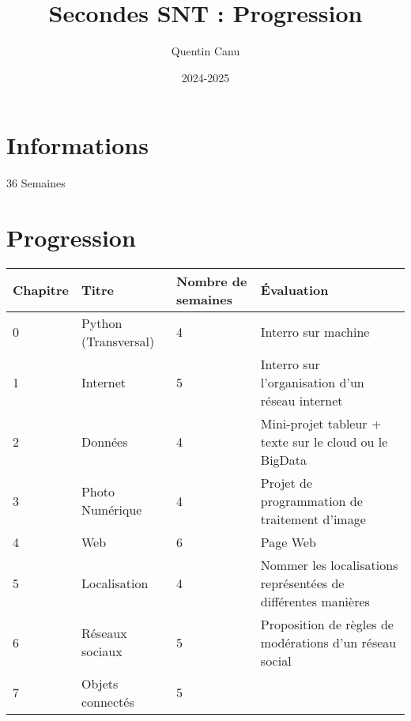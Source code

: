 \documentclass{article}
\title{Secondes SNT : Progression}
\author{Quentin Canu}
\date{2024-2025}
\begin{document}
\maketitle

\section{Informations}

36 Semaines

\section{Progression}

\begin{center}
    
\begin{tabular}{|l|p{4cm}|p{2cm}|p{2cm}|}
\hline
Chapitre
    & 
Titre
        & 
Nombre de semaines
            &
Évaluation\\
\hline
0   &
Python (Transversal)
        &
4
            &
Interro sur machine\\
\hline
1   &
Internet
        &
5
            &
Interro sur l'organisation d'un réseau internet\\
\hline
2   &
Données
        &
4       
            &
Mini-projet tableur + texte sur le cloud ou le BigData
\\
\hline
3   &
Photo Numérique
        &
4
            &
Projet de programmation de traitement d'image\\
\hline
4   &
Web     &
6
            &
Page Web\\
\hline
5   &
Localisation
        &
4
            &
Nommer les localisations représentées de différentes manières\\
\hline
6   &
Réseaux sociaux
        &
5
            &
Proposition de règles de modérations d'un réseau social\\
\hline
7   &
Objets connectés
        &
5
            &
\\
\hline
\end{tabular}
\end{center}
\end{document}
